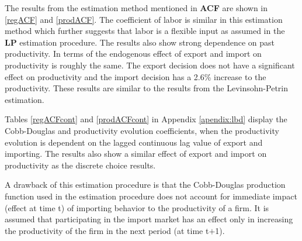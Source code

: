 \documentclass[12pt]{article}
\begin{document}
The results from the estimation method mentioned in
\textcite{ackerberg2006structural} \textbf{ACF} are shown in \ref{regACF} and \ref{prodACF}. The coefficient of labor is similar in this
estimation method which further suggests that labor is a flexible
input as assumed in the \textbf{LP} estimation procedure. The results also
show strong dependence on past productivity. In terms of the endogenous effect
of export and import on productivity is roughly the same. The export
decision does not have a significant effect on productivity and the
import decision has a 2.6\% increase to the productivity. These
results are similar to the results from the Levinsohn-Petrin
estimation.   %
 
 




Tables \ref{regACFcont} and \ref{prodACFcont} in Appendix \ref{apendix:lbd}  display the Cobb-Douglas and
productivity evolution
coefficients,  when the
productivity evolution is dependent on the lagged continuous lag value of
export and importing. The results also show a similar effect of export
and import on productivity as the discrete choice results.  

A drawback of this estimation procedure is that 
the Cobb-Douglas production function used in the estimation procedure  does not
account for immediate impact (effect at time t) of 
importing behavior to the productivity of a firm.  It is assumed that
participating in the import market has an effect only in increasing the
productivity of the firm in the next period (at time t$+$1). 

\end{document}

